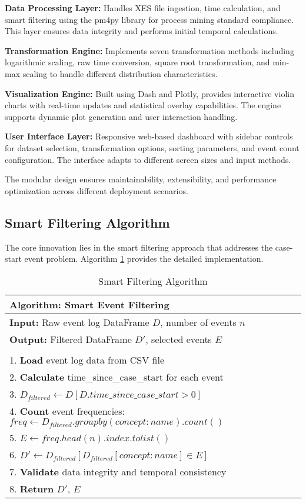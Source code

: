 \documentclass[11pt,a4paper]{article}
\begin{document}
\textbf{Data Processing Layer:} Handles XES file ingestion, time calculation, and smart filtering using the pm4py library for process mining standard compliance. This layer ensures data integrity and performs initial temporal calculations.

\textbf{Transformation Engine:} Implements seven transformation methods including logarithmic scaling, raw time conversion, square root transformation, and min-max scaling to handle different distribution characteristics.

\textbf{Visualization Engine:} Built using Dash and Plotly, provides interactive violin charts with real-time updates and statistical overlay capabilities. The engine supports dynamic plot generation and user interaction handling.

\textbf{User Interface Layer:} Responsive web-based dashboard with sidebar controls for dataset selection, transformation options, sorting parameters, and event count configuration. The interface adapts to different screen sizes and input methods.

The modular design ensures maintainability, extensibility, and performance optimization across different deployment scenarios.

\subsection{Smart Filtering Algorithm}

The core innovation lies in the smart filtering approach that addresses the case-start event problem. Algorithm \ref{alg:smartfilter} provides the detailed implementation.

\begin{table}[H]
\centering
\caption{Smart Filtering Algorithm}
\label{alg:smartfilter}
\begin{tabular}{@{}l@{}}
\toprule
\textbf{Algorithm: Smart Event Filtering} \\
\midrule
\textbf{Input:} Raw event log DataFrame $D$, number of events $n$ \\
\textbf{Output:} Filtered DataFrame $D'$, selected events $E$ \\
\\
1. \textbf{Load} event log data from CSV file \\
2. \textbf{Calculate} time\_since\_case\_start for each event \\
3. $D_{filtered} \leftarrow D[D.time\_since\_case\_start > 0]$ \\
4. \textbf{Count} event frequencies: $freq \leftarrow D_{filtered}.groupby(concept:name).count()$ \\
5. $E \leftarrow freq.head(n).index.tolist()$ \\
6. $D' \leftarrow D_{filtered}[D_{filtered}[concept:name] \in E]$ \\
7. \textbf{Validate} data integrity and temporal consistency \\
8. \textbf{Return} $D'$, $E$ \\
\bottomrule
\end{tabular}
\end{table}
\end{document}
